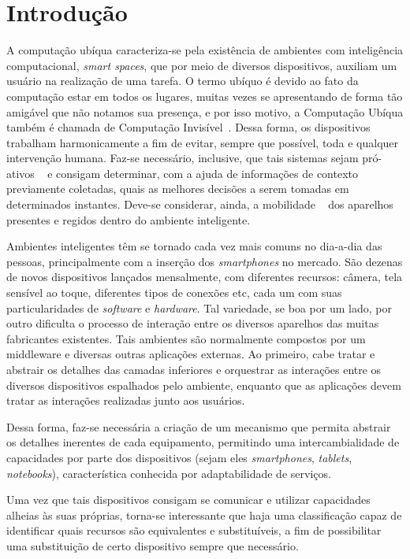 \chapter{Introdução}

A computação ubíqua caracteriza-se pela existência de ambientes com inteligência computacional, \emph{smart spaces}, que por meio de diversos dispositivos, auxiliam um usuário na realização de uma tarefa. O termo ubíquo é devido ao fato da computação estar em todos os lugares, muitas vezes se apresentando de forma tão amigável que não notamos sua presença, e por isso motivo, a Computação Ubíqua também é chamada de Computação Invisível~\cite{gomes2007, weiser1993, weiser1999}. Dessa forma, os dispositivos trabalham harmonicamente a fim de evitar, sempre que possível, toda e qualquer intervenção humana. Faz-se necessário, inclusive, que tais sistemas sejam pró-ativos ~\cite{gomes2007, buzeto2010} e consigam determinar, com a ajuda de informações de contexto previamente coletadas, quais as melhores decisões a serem tomadas em determinados instantes. Deve-se considerar, ainda, a mobilidade ~\cite{gomes2007, buzeto2010, weiser1999} dos aparelhos presentes e regidos dentro do ambiente inteligente.

Ambientes inteligentes têm se tornado cada vez mais comuns no dia-a-dia das pessoas, principalmente com a inserção dos \emph{smartphones} no mercado. São dezenas de novos dispositivos lançados mensalmente, com diferentes recursos: câmera, tela sensível ao toque, diferentes tipos de conexões etc, cada um com suas particularidades de \emph{software} e \emph{hardware}. Tal variedade, se boa por um lado, por outro dificulta o processo de interação entre os diversos aparelhos das muitas fabricantes existentes. Tais ambientes são normalmente compostos por um middleware e diversas outras aplicações externas. Ao primeiro, cabe tratar e abstrair os detalhes das camadas inferiores e orquestrar as interações entre os diversos dispositivos espalhados pelo ambiente, enquanto que as aplicações devem tratar as interações realizadas junto aos usuários.

Dessa forma, faz-se necessária a criação de um mecanismo que permita abstrair os detalhes inerentes de cada equipamento, permitindo uma intercambialidade de capacidades por parte dos dispositivos (sejam eles \emph{smartphones}, \emph{tablets}, \emph{notebooks}), característica conhecida por adaptabilidade de serviços.

Uma vez que tais dispositivos consigam se comunicar e utilizar capacidades alheias às suas próprias, torna-se interessante que haja uma classificação capaz de identificar quais recursos são equivalentes e substituíveis, a fim de possibilitar uma substituição de certo dispositivo sempre que necessário.

